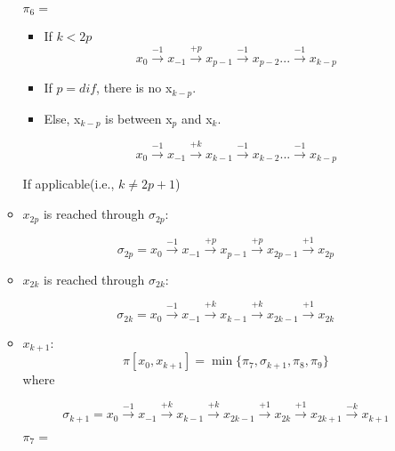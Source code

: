 \begin{itemize}
\begin{itemize}
$\pi_6=$


 
\begin{itemize}
\item If $k<2p$
 $$  x_{0} \xrightarrow {-1} x_{-1} \xrightarrow {+p} x_{p-1} \xrightarrow {-1} x_{p-2}...\xrightarrow {-1} x_ {k-p}$$
\item If $p = dif$, there is no x$_ {k-p}$.
\item Else, x$_ {k-p}$ is between x$_ {p}$ and x$_ {k}$. %

$$ x_{0} \xrightarrow {-1} x_{-1} \xrightarrow {+k} x_{k-1} \xrightarrow {-1} x_{k-2}...\xrightarrow {-1} x_ {k-p}$$
\end{itemize}
If applicable(i.e., $k\neq 2p+1$)



\item $x_{2p}$ is reached through $\sigma_{2p}$:

$$\sigma_{2p} = x_{0} \xrightarrow {-1} x_{-1} \xrightarrow {+p} x_{p-1} \xrightarrow {+p} x_{2p-1}\xrightarrow {+1} x_{2p} $$





\item $x_{2k}$ is reached through $\sigma_{2k}$:
 
$$\sigma_{2k} = x_{0} \xrightarrow {-1} x_{-1} \xrightarrow {+k} x_{k-1} \xrightarrow {+k} x_{2k-1} \xrightarrow {+1}  x_{2k}$$


\item$x_{k+1}$:
$$ \pi[x_0,x_{k+1}] = \min \{ \pi_7, \sigma_{k+1},\pi_8,\pi_9\}$$
where

$$  \sigma_{k+1} =   x_{0} \xrightarrow {-1} x_{-1} \xrightarrow {+k} x_{k-1} \xrightarrow {+k} x_{2k-1}
 \xrightarrow {+1}  x_{2k}\xrightarrow {+1} x_{2k+1} \xrightarrow {-k} x_{k+1}$$

$\pi_7=$


\end{itemize}
\end{itemize}
